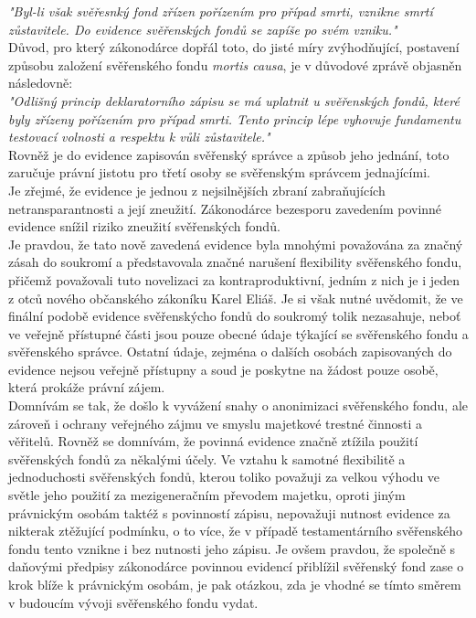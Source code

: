\documentclass{article}
\begin{document}
\textit{"Byl-li však svěřesnký fond zřízen pořízením pro případ smrti, vznikne smrtí zůstavitele. Do evidence svěřenských fondů se zapíše po svém vzniku."}\\

Důvod, pro který zákonodárce dopřál toto, do jisté míry zvýhodňující, postavení způsobu založení svěřenského fondu \textit{mortis causa}, je v důvodové zprávě objasněn následovně:\\

\textit{"Odlišný princip deklaratorního zápisu se má uplatnit u svěřenských fondů, které byly zřízeny pořízením pro případ smrti. Tento princip lépe vyhovuje fundamentu testovací volnosti a respektu k vůli zůstavitele."}\\

Rovněž je do evidence zapisován svěřenský správce a způsob jeho jednání, toto zaručuje právní jistotu pro třetí osoby se svěřenským správcem jednajícími.\\

Je zřejmé, že evidence je jednou z nejsilnějších zbraní zabraňujících netransparantnosti a její zneužití. Zákonodárce bezesporu zavedením povinné evidence snížil riziko zneužití svěřenských fondů.\\

Je pravdou, že tato nově zavedená evidence byla mnohými považována za značný zásah do soukromí a představovala značné narušení flexibility svěřenského fondu, přičemž považovali tuto novelizaci za kontraproduktivní, jedním z nich je i jeden z otců nového občanského zákoníku Karel Eliáš. Je si však nutné uvědomit, že ve finální podobě evidence svěřenskýcho fondů do soukromý tolik nezasahuje, neboť ve veřejně přístupné části jsou pouze obecné údaje týkající se svěřenského fondu a svěřenského správce. Ostatní údaje, zejména o dalších osobách zapisovaných do evidence nejsou veřejně přístupny a soud je poskytne na žádost pouze osobě, která prokáže právní zájem.\\

Domnívám se tak, že došlo k vyvážení snahy o anonimizaci svěřenského fondu, ale zároveň i ochrany veřejného zájmu ve smyslu majetkové trestné činnosti a věřitelů. Rovněž se domnívám, že povinná evidence značně ztížila použití svěřenských fondů za někalými účely. Ve vztahu k samotné flexibilitě a jednoduchosti svěřenských fondů, kterou toliko považuji za velkou výhodu ve světle jeho použití za mezigeneračním převodem majetku, oproti jiným právnickým osobám taktéž s povinností zápisu, nepovažuji nutnost evidence za nikterak ztěžující podmínku, o to více, že v případě testamentárního svěřenského fondu tento vznikne i bez nutnosti jeho zápisu. Je ovšem pravdou, že společně s daňovými předpisy zákonodárce povinnou evidencí přiblížil svěřenský fond zase o krok blíže k právnickým osobám, je pak otázkou, zda je vhodné se tímto směrem v budoucím vývoji svěřenského fondu vydat.\\
\end{document}
